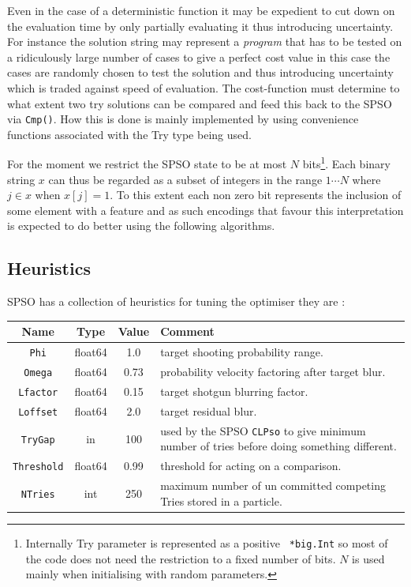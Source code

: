 \documentclass[a4paper,oneside,english]{book}
\numberwithin{equation}{section}
\numberwithin{figure}{section}
\begin{document}
Even in the case of a deterministic  function it may be expedient to cut down on the evaluation time by only partially evaluating it thus introducing uncertainty. For instance the solution string may represent a \emph{program} that has to be tested on a ridiculously large number of cases to give a perfect cost value in this case the cases are randomly chosen to test the solution and thus introducing uncertainty which is traded against speed of evaluation. The cost-function must determine to what extent two try solutions can be compared and feed this back to the SPSO via \texttt{Cmp()}. How this is done is mainly implemented by using convenience functions associated with the Try type being used.  

For the moment we restrict the SPSO state to be at most $N$ bits\footnote{Internally Try parameter is represented as a positive \texttt{ *big.Int} so most of the code does not need the restriction to a fixed number of bits. $N$ is used mainly when initialising with random parameters. }. Each binary string $x$ can thus be regarded as a subset of integers in the range $1 \cdots N$  where $j \in x$ when $x[j] = 1$. To this extent each non zero bit represents the inclusion of some element with a feature and as such encodings that favour this interpretation is expected to do better using the following algorithms. 

\subsection{Heuristics}

SPSO has a collection of heuristics for tuning the optimiser they are :

\begin{tabular}{|c|c|c|p{6cm}|}\hline	
	Name& Type &Value& Comment\\
	\hline \hline 
	\texttt{Phi}&float64&1.0& target shooting probability range. \\
	\texttt{Omega}& float64&0.73&probability velocity factoring after target blur.\\
   \texttt{Lfactor}& float64&0.15&target shotgun blurring factor. \\
	\texttt{Loffset}& float64&2.0& target residual blur.\\
	\texttt{TryGap}& in&100&used by the SPSO \texttt{CLPso} to give minimum 
	number of tries before doing something different.\\
	\texttt{Threshold}& float64&0.99& threshold for acting on a comparison.\\
	\texttt{NTries}& int&250&maximum number of un committed competing Tries  stored in a particle.\\
	\hline
\end{tabular}
\end{document}
